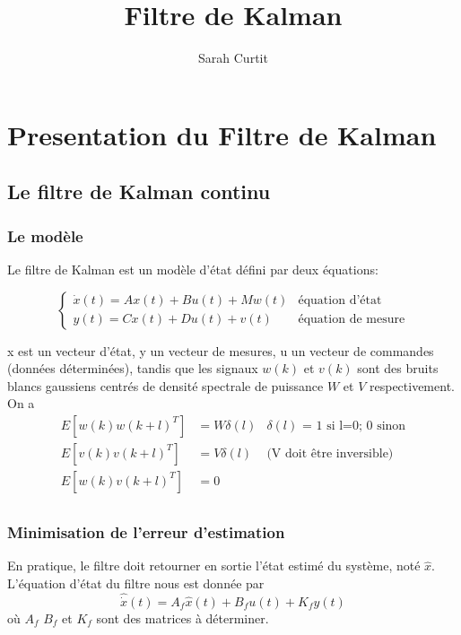 \documentclass[12pt,twoside,a4paper]{article}
\title{Filtre de Kalman}
\author{Sarah Curtit}
\date{}
\begin{document}
	\maketitle

\section{Presentation du Filtre de Kalman}

\subsection{Le filtre de Kalman continu}

\subsubsection{Le modèle}

Le filtre de Kalman est un modèle d'état défini par deux équations:

$$
\left\{
\begin{array}{ll}
        \dot{x}(t) = A x(t)  + B u(t) +M w(t)  & \text{équation d'état}  \\
        y(t) = C x(t) + Du(t) + v(t) & \text{équation de mesure}
\end{array}
\right.
$$



x est un vecteur d'état, y un vecteur de mesures, u un vecteur de commandes (données déterminées), tandis que les signaux $w(k)$ et $v(k)$ sont des bruits blancs gaussiens centrés de densité spectrale de puissance $W$ et $V$ respectivement. On a
$$
\begin{array}{lll}
E[w(k) w(k+l)^T ] &= W\delta(l) & \delta(l) \text{ = 1 si l=0; 0 sinon} \\
E[v(k) v(k+l)^T ] &= V \delta(l) & \text{(V doit être inversible)}\\
E[w(k) v(k+l)^T ] &= 0 & \\
\end{array}
$$

\subsubsection{Minimisation de l'erreur d'estimation}

En pratique, le filtre doit retourner en sortie l'état estimé du système, noté $\hat{x}$.
L'équation d'état du filtre nous est donnée par
$$ \hat{\dot{x}}(t) = A_f\hat{x}(t)+B_fu(t)+K_fy(t) $$
où $A_f$ $B_f$ et $K_f$ sont des matrices à déterminer. \\
\vspace{0.5cm}
\end{document}
